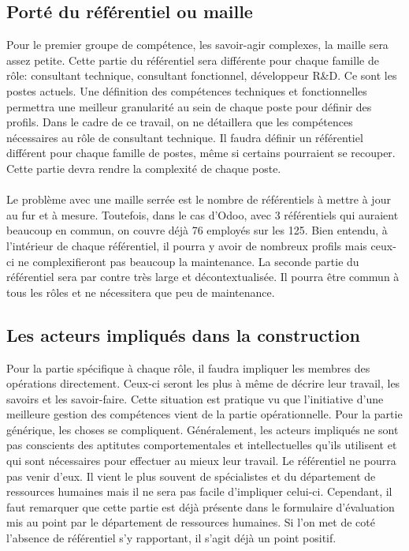 \subsection{Porté du référentiel ou maille}
Pour le premier groupe de compétence, les savoir-agir complexes, la maille sera assez petite. Cette partie du référentiel sera différente pour chaque famille de rôle: consultant technique, consultant fonctionnel, développeur R\&D. Ce sont les postes actuels. Une définition des compétences techniques et fonctionnelles permettra une meilleur granularité au sein de chaque poste pour définir des profils. Dans le cadre de ce travail, on ne détaillera que les compétences nécessaires au rôle de consultant technique. Il faudra définir un référentiel différent pour chaque famille de postes, même si certains pourraient se recouper. Cette partie devra rendre la complexité de chaque poste. 

\paragraph{}Le problème avec une maille serrée est le nombre de référentiels à mettre à jour au fur et à mesure.
 Toutefois, dans le cas d'Odoo, avec 3 référentiels qui auraient beaucoup en commun, on couvre déjà 76 employés sur les 125. Bien entendu, à l'intérieur de chaque référentiel, il pourra y avoir de nombreux profils mais ceux-ci ne complexifieront pas beaucoup la maintenance. La seconde partie du référentiel sera par contre très large et décontextualisée. Il pourra être commun à tous les rôles et ne nécessitera que peu de maintenance. 

\subsection{Les acteurs impliqués dans la construction}
Pour la partie spécifique à chaque rôle, il faudra impliquer les membres des opérations directement. Ceux-ci seront les plus à même de décrire leur travail, les savoirs et les savoir-faire. Cette situation est pratique vu que l'initiative d'une meilleure gestion des compétences vient de la partie opérationnelle. Pour la partie générique, les choses se compliquent. Généralement, les acteurs impliqués ne sont pas conscients des aptitutes comportementales et intellectuelles qu'ils utilisent et qui sont nécessaires pour effectuer au mieux leur travail. Le référentiel ne pourra pas venir d'eux. Il vient le plus souvent de spécialistes et du département de ressources humaines mais il ne sera pas facile d'impliquer celui-ci. Cependant, il faut remarquer que cette partie est déjà présente dans le formulaire d'évaluation mis au point par le département de ressources humaines. Si l'on met de coté l'absence de référentiel s'y rapportant, il s'agit déjà un point positif.




